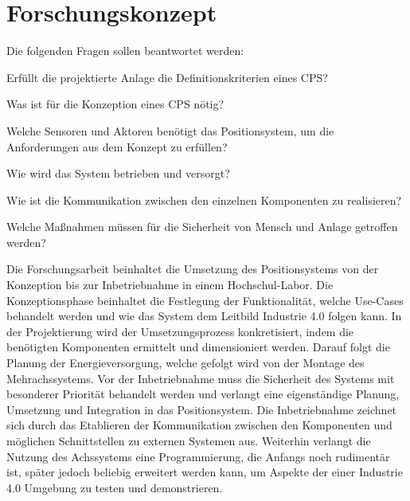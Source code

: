 \documentclass[12pt, a4paper, twoside]{article} %
\begin{document}
\section{Forschungskonzept}
Die folgenden Fragen sollen beantwortet werden:
\begin{compactitem}
	\item Erfüllt die projektierte Anlage die Definitionskriterien eines CPS?
	\item Was ist für die Konzeption eines CPS nötig?
	\item Welche Sensoren und Aktoren benötigt das Positionsystem, um die Anforderungen aus dem Konzept zu erfüllen?
	\item Wie wird das System betrieben und versorgt?
	\item Wie ist die Kommunikation zwischen den einzelnen Komponenten zu realisieren?
	\item Welche Maßnahmen müssen für die Sicherheit von Mensch und Anlage getroffen werden?
\end{compactitem}
Die Forschungsarbeit beinhaltet die Umsetzung des Positionsystems von der Konzeption bis zur Inbetriebnahme in einem Hochschul-Labor. Die Konzeptionsphase beinhaltet die Festlegung der Funktionalität, welche Use-Cases behandelt werden und wie das System dem Leitbild Industrie 4.0 folgen kann. In der Projektierung wird der Umsetzungsprozess konkretisiert, indem die benötigten Komponenten ermittelt und dimensioniert werden. Darauf folgt die Planung der Energieversorgung, welche gefolgt wird von der Montage des Mehrachssystems. Vor der Inbetriebnahme muss die Sicherheit des Systems mit besonderer Priorität behandelt werden und verlangt eine eigenständige Planung, Umsetzung und Integration in das Positionsystem. Die Inbetriebnahme zeichnet sich durch das Etablieren der Kommunikation zwischen den Komponenten und möglichen Schnittstellen zu externen Systemen aus. Weiterhin verlangt die Nutzung des Achssystems eine Programmierung, die Anfangs noch rudimentär ist, später jedoch beliebig erweitert werden kann, um Aspekte der einer Industrie 4.0 Umgebung zu testen und demonstrieren. 
\end{document}
